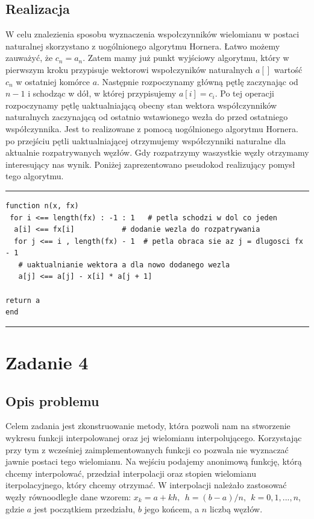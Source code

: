 \documentclass[]{article}
\begin{document}
\subsection{Realizacja}
W celu znalezienia sposobu wyznaczenia wspołczynników wielomianu w postaci naturalnej skorzystano z uogólnionego algorytmu Hornera. Łatwo możemy zauważyć, że $c_n = a_n$. Zatem mamy już punkt wyjściowy algorytmu, który w pierwszym kroku przypisuje wektorowi wspołczyników naturalnych $a[]$ wartość $c_n$ w ostatniej komórce $a$. Następnie rozpoczynamy główną pętlę zaczynając od $n-1$ i schodząc w dół, w której przypisujemy $a[i] = c_i$. Po tej operacji rozpoczynamy pętlę uaktualniającą obecny stan wektora współczynników naturalnych zaczynającą od ostatnio wstawionego wezła do przed ostatniego współczynnika. Jest to realizowane z pomocą uogólnionego algorytmu Hornera. po przejściu pętli uaktualniającej otrzymujemy współczynniki naturalne dla aktualnie rozpatrywanych węzłów. Gdy rozpatrzymy waszystkie węzły otrzymamy interesujący nas wynik. Poniżej zaprezentowano pseudokod realizujący pomysł tego algorytmu.   
\\
\hrule
\begin{lstlisting}
function n(x, fx)
 for i <== length(fx) : -1 : 1   # petla schodzi w dol co jeden
  a[i] <== fx[i]           # dodanie wezla do rozpatrywania
  for j <== i , length(fx) - 1  # petla obraca sie az j = dlugosci fx - 1      
   # uaktualnianie wektora a dla nowo dodanego wezla
   a[j] <== a[j] - x[i] * a[j + 1] 

return a
end
\end{lstlisting}
\hrule
\section{Zadanie 4}
\subsection{Opis problemu}
Celem zadania jest zkonstruowanie metody, która pozwoli nam na stworzenie wykresu funkcji interpolowanej oraz jej wielomianu interpolującego. Korzystając przy tym z wcześniej zaimplementowanych funkcji co pozwala nie wyznaczać jawnie postaci tego wielomianu. Na wejściu podajemy anonimową funkcję, którą chcemy interpolować, przedział interpolacji oraz stopien wielomianu iterpolacyjnego, który chcemy otrzymać. W interpolacji należało zastosować węzły równoodległe dane wzorem: $ x_k = a + kh, \:\: h = (b - a)/n, \:\:  k = 0, 1, ..., n$, gdzie $a$ jest początkiem przedziału, $b$ jego końcem, a $n$ liczbą węzłów.
\end{document}
